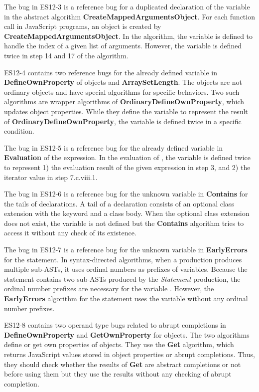 The bug in ES12-3 is a reference bug for a duplicated declaration of the variable
 in the abstract algorithm \textbf{CreateMappedArgumentsObject}.
For each function call in JavaScript programs, an  object is
created by \textbf{CreateMappedArgumentsObject}.  In the algorithm, the variable
 is defined to handle the index of a given list of arguments.
However, the variable is defined twice in step 14 and 17 of the algorithm.

ES12-4 contains two reference bugs for the already defined variable 
in \textbf{DefineOwnProperty} of  objects and
\textbf{ArraySetLength}.  The  objects are
not ordinary objects and have special algorithms for specific behaviors.
Two such algorithms are wrapper algorithms of
\textbf{OrdinaryDefineOwnProperty}, which updates object properties.
While they define the variable  to represent the result of
\textbf{OrdinaryDefineOwnProperty}, the variable is defined twice in a specific condition.

The bug in ES12-5 is a reference bug for the already defined variable 
in \textbf{Evaluation} of the  expression.
  In the evaluation of , the variable  is defined twice to
represent 1) the evaluation result of the given expression  in step
3, and 2) the iterator value in step 7.c.viii.1.

The bug in ES12-6 is a reference bug for the unknown variable 
in \textbf{Contains} for the tails of  declarations.  A tail of a
 declaration consists of an optional class extension with the
 keyword and a class body.  When the
optional class extension does not exist, the variable  is not
defined but the \textbf{Contains} algorithm tries to access it without any check
of its existence.

The bug in ES12-7 is a reference bug for the unknown variable  in
\textbf{EarlyErrors} for the  statement.  In syntax-directed algorithms,
when a production produces multiple sub-ASTs, it uses ordinal numbers as prefixes of variables.
Because the  statement contains two sub-ASTs
produced by the \textit{Statement} production, the ordinal number prefixes
are necessary for the variable .  However, the
\textbf{EarlyErrors} algorithm for the  statement uses the variable without any
ordinal number prefixes.

ES12-8 contains two operand type bugs related to abrupt completions in
\textbf{DefineOwnProperty} and \textbf{GetOwnProperty} for  objects.
The two algorithms define or get own properties of  objects.
They use the \textbf{Get} algorithm, which returns JavaScript
values stored in object properties or abrupt completions.
Thus, they should check whether the results of \textbf{Get} are abstract completions or not
before using them but they use the results without any checking of abrupt completion.
